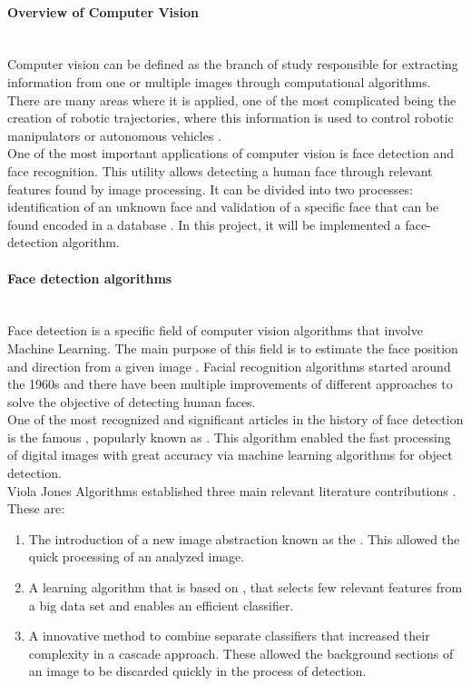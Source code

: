 \documentclass[11pt]{report} %
\newcommand{\subsubsubsection}[1]{\paragraph{#1}\mbox{}\\}
\begin{document}
\subsubsubsection{Overview of Computer Vision}

Computer vision can be defined as the branch of study responsible for extracting information from one or multiple images through computational algorithms. There are many areas where it is applied, one of the most complicated being the creation of robotic trajectories, where this information is used to control robotic manipulators or autonomous vehicles \citep{cite_computer_vision_advances_in_computers}.\\

One of the most important applications of computer vision is face detection and face recognition. This utility allows detecting a human face through relevant features found by image processing. It can be divided into two processes: identification of an unknown face and validation of a specific face that can be found encoded in a database \citep{cite_computer_vision_techniques_for_face_recognition}. In this project, it will be implemented a face-detection algorithm.\\

\subsubsubsection{Face detection algorithms}

Face detection is a specific field of computer vision algorithms that involve Machine Learning. The main purpose of this field is to estimate the face position and direction from a given image \citep{cite_face_detection_science_direct_article}. Facial recognition algorithms started around the 1960s and there have been multiple improvements of different approaches to solve the objective of detecting human faces.\\

One of the most recognized and significant articles in the history of face detection is the famous , popularly known as  \citep{cite_viola_jones_face_detection_algorithm}. This algorithm enabled the fast processing of digital images with great accuracy via machine learning algorithms for object detection.\\

Viola Jones Algorithms established three main relevant literature contributions \citep{cite_viola_jones_face_detection_algorithm}. These are:\\

\begin{enumerate}
    \item The introduction of a new image abstraction known as the . This allowed the quick processing of an analyzed image.
    \item A learning algorithm that is based on , that selects few relevant features from a big data set and enables an efficient classifier.
    \item A innovative method to combine separate classifiers that increased their complexity in a cascade approach. These allowed the background sections of an image to be discarded quickly in the process of detection.\\
\end{enumerate}
\end{document}

